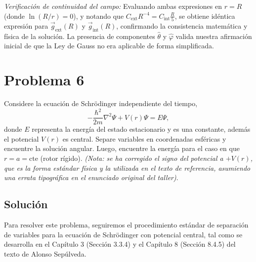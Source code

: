 \documentclass[a4paper]{article}
\begin{document}
\textit{Verificación de continuidad del campo:} Evaluando ambas expresiones en $r=R$ (donde $\ln(R/r) = 0$), y notando que $C_{\text{ext}} R^{-4} = C_{\text{int}} \frac{R}{5}$, se obtiene idéntica expresión para $\vec{g}_{\text{ext}}(R)$ y $\vec{g}_{\text{int}}(R)$, confirmando la consistencia matemática y física de la solución. La presencia de componentes $\hat{\theta}$ y $\hat{\varphi}$ valida nuestra afirmación inicial de que la Ley de Gauss no era aplicable de forma simplificada.


\section{Problema 6}
Considere la ecuación de Schrödinger independiente del tiempo, 
$$
-\frac{\hbar^2}{2m}\nabla^2\Psi + V(r)\Psi = E\Psi,
$$
donde $E$ representa la energía del estado estacionario y es una constante, además el potencial $V(r)$ es central. Separe variables en coordenadas esféricas y encuentre la solución angular. Luego, encuentre la energía para el caso en que $r = a = \text{cte}$ (rotor rígido). 
\textit{(Nota: se ha corregido el signo del potencial a $+V(r)$, que es la forma estándar física y la utilizada en el texto de referencia, asumiendo una errata tipográfica en el enunciado original del taller)}.

\subsection{Solución}
Para resolver este problema, seguiremos el procedimiento estándar de separación de variables para la ecuación de Schrödinger con potencial central, tal como se desarrolla en el Capítulo 3 (Sección 3.3.4) y el Capítulo 8 (Sección 8.4.5) del texto de Alonso Sepúlveda.
\end{document}
